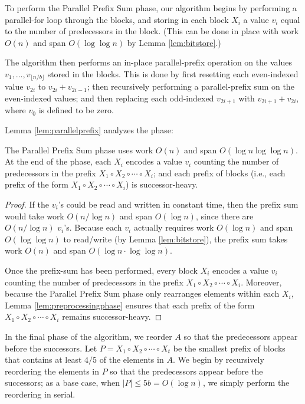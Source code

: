 \documentclass[twoside,leqno,twocolumn]{article}
\renewcommand{\paragraph}[1]{\vspace{0.09in}\noindent{\bf \boldmath #1.}}
\begin{document}
To perform the Parallel Prefix Sum phase, our algorithm begins by
performing a parallel-for loop through the blocks, and storing in each
block $X_i$ a value $v_i$ equal to the number of predecessors in the
block. (This can be done in place with work $O(n)$ and span $O(\log
\log n)$ by Lemma \ref{lem:bitstore}.)

The algorithm then performs an in-place parallel-prefix operation on
the values $v_1, \ldots, v_{\lfloor n / b \rfloor}$ stored in the
blocks. This is done by first resetting each even-indexed value
$v_{2i}$ to $v_{2i} + v_{2i - 1}$; then recursively performing a
parallel-prefix sum on the even-indexed values; and then replacing
each odd-indexed $v_{2i + 1}$ with $v_{2i + 1} + v_{2i}$, where $v_0$
is defined to be zero.

Lemma \ref{lem:parallelprefix} analyzes the phase:
\begin{lemma}
  The Parallel Prefix Sum phase uses work $O(n)$ and span
  $O(\log n \log \log n)$. At the end of the phase, each $X_i$ encodes
  a value $v_i$ counting the number of predecessors in the prefix
  $X_1 \circ X_2 \circ \cdots \circ X_i$; and each prefix of blocks
  (i.e., each prefix of the form
  $X_1 \circ X_2 \circ \cdots \circ X_i$) is successor-heavy.
\label{lem:parallelprefix}
\end{lemma}
\begin{proof}
If the $v_i$'s could be read and written in constant time, then the
prefix sum would take work $O(n / \log n)$ and span $O(\log n)$, since
there are $O(n / \log n)$ $v_i$'s. Because each $v_i$ actually
requires work $O(\log n)$ and span $O(\log \log n)$ to read/write (by
Lemma \ref{lem:bitstore}), the prefix sum takes work $O(n)$ and span
$O(\log n \cdot \log \log n)$.

Once the prefix-sum has been performed, every block $X_i$
encodes a value $v_i$ counting the number of predecessors in the
prefix $X_1 \circ X_2 \circ \cdots \circ X_i$. Moreover, because the
Parallel Prefix Sum phase only rearranges elements within each $X_i$,
Lemma \ref{lem:preprocessingphase} ensures that each prefix of the
form $X_1 \circ X_2 \circ \cdots \circ X_i$ remains successor-heavy.
\end{proof}

\paragraph{In-Place Reordering}
In the final phase of the algorithm, we reorder $A$ so that the
predecessors appear before the successors. Let $P = X_1 \circ X_2
\circ \cdots \circ X_t$ be the smallest prefix of blocks that contains
at least $4/5$ of the elements in $A$. We begin by recursively
reordering the elements in $P$ so that the predecessors appear before
the successors; as a base case, when $|P| \le 5b = O(\log n)$, we
simply perform the reordering in serial.
\end{document}
